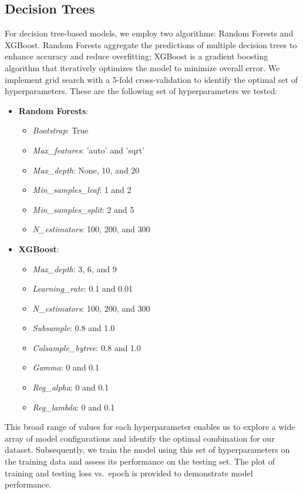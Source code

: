 \documentclass[conference]{IEEEtran}
\begin{document}
\subsection{Decision Trees} 

For decision tree-based models, we employ two algorithms: Random Forests and XGBoost. Random Forests aggregate the predictions of multiple decision trees to enhance accuracy and reduce overfitting; XGBoost is a gradient boosting algorithm that iteratively optimizes the model to minimize overall error. We implement grid search with a 5-fold cross-validation to identify the optimal set of hyperparameters. These are the following set of hyperparameters we tested: 

\begin{itemize}
    \item \textbf{Random Forests}: 
    \begin{itemize}
        \item \emph{Bootstrap}: True
        \item \emph{Max\_features}: 'auto' and 'sqrt'
        \item \emph{Max\_depth}: None, 10, and 20
        \item \emph{Min\_samples\_leaf}: 1 and 2
        \item \emph{Min\_samples\_split}: 2 and 5
        \item \emph{N\_estimators}: 100, 200, and 300
    \end{itemize}
    
    \item \textbf{XGBoost}: 
    \begin{itemize}
        \item \emph{Max\_depth}: 3, 6, and 9
        \item \emph{Learning\_rate}: 0.1 and 0.01
        \item \emph{N\_estimators}: 100, 200, and 300
        \item \emph{Subsample}: 0.8 and 1.0
        \item \emph{Colsample\_bytree}: 0.8 and 1.0
        \item \emph{Gamma}: 0 and 0.1
        \item \emph{Reg\_alpha}: 0 and 0.1
        \item \emph{Reg\_lambda}: 0 and 0.1
    \end{itemize}
\end{itemize}

This broad range of values for each hyperparameter enables us to explore a wide array of model configurations and identify the optimal combination for our dataset. Subsequently, we train the model using this set of hyperparameters on the training data and assess its performance on the testing set. The plot of training and testing loss vs.\ epoch is provided to demonstrate model performance.
\end{document}
